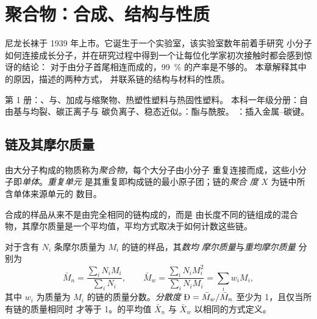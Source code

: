 \chapter{聚合物：合成、结构与性质}\label{ch:b2:polymer-synthesis}

尼龙长袜于 1939 年上市。它诞生于一个实验室，该实验室数年前着手研究
小分子如何连接成长分子，并在研究过程中得到一个让每位化学家初次接触时都会感到惊讶的结论：
对于由分子首尾相连而成的，99~\% 的产率是不够的。
本章解释其中的原因，描述的两种方式，
并联系链的结构与材料的性质。

\begin{recall}
第 1 册：、与、加成与缩聚物、热塑性塑料与热固性塑料。
本科一年级分册：自由基与均裂、碳正离子与
碳负离子、稳态近似。：酯与酰胺。
：插入金属–碳键。
\end{recall}

\section{链及其摩尔质量}

\begin{definition}[聚合物]\label{def:b2:polymer-synthesis:polymer}
由大分子构成的物质称为\emph{聚合物}，每个大分子由小分子
重复连接而成，这些小分子即\emph{单体}。\emph{重复单元}
是其重复即构成链的最小原子团；链的\emph{聚合
度} $X$ 为链中所含单体来源单元的
数目。
\end{definition}

合成的样品从来不是由完全相同的链构成的，而是
由长度不同的链组成的混合物，其摩尔质量是一个平均值，平均方式取决于如何计数这些链。

\begin{definition}[摩尔质量的平均值]\label{def:b2:polymer-synthesis:averages}
对于含有 $N_i$ 条摩尔质量为 $M_i$ 的链的样品，其\emph{数均
摩尔质量}与\emph{重均摩尔质量}
分别为
\begin{equation*}
\bar M_n = \frac{\sum_i N_i M_i}{\sum_i N_i}, \qquad
\bar M_w = \frac{\sum_i N_i M_i^2}{\sum_i N_i M_i} = \sum_i w_i M_i,
\end{equation*}
其中 $w_i$ 为质量为 $M_i$ 的链的质量分数。\emph{分散度}
$\text{\DH} = \bar M_w/\bar M_n$ 至少为 1，且仅当所有链的质量相同时
才等于 1。的平均值 $\bar X_n$ 与 $\bar X_w$
以相同的方式定义。
\end{definition}

